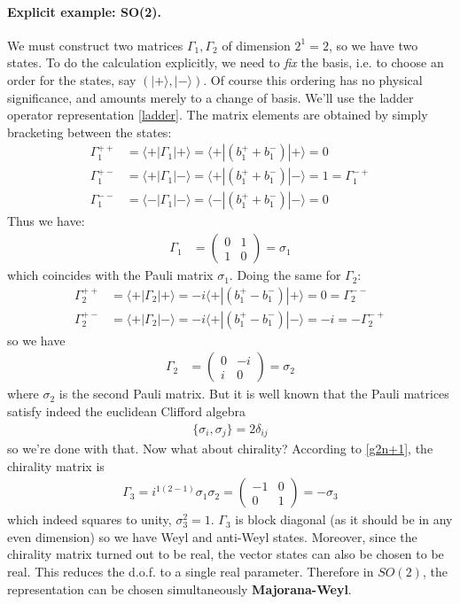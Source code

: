 \documentclass[a4paper,12pt]{article}
\numberwithin{equation}{section}
\numberwithin{exe}{section}
\newcommand{\G}{{\Gamma}}
\newcommand{\ket}[1]{| #1 \rangle}
\newcommand{\bra}[1]{\langle #1 |}
\begin{document}
\paragraph{Explicit example: SO(2).} We must construct two matrices $\G_1,\G_2$ of dimension $2^1=2$, so we have two states. To do the calculation explicitly, we need to \textit{fix} the basis, i.e. to choose an order for the states, say $\left( \ket{+},\ket{-} \right)$. Of course this ordering has no physical significance, and amounts merely to a change of basis. We'll use the ladder operator representation \eqref{ladder}. The matrix elements are obtained by simply bracketing between the states:
	\begin{align}\label{}
	\G_1^{++}&=\bra{+}  \G_1 \ket{+}=\bra{+}  \left( b_1^++b_1^- \right) \ket{+}=0\\
	\G_1^{+-}&=\bra{+}  \G_1 \ket{-}=\bra{+}  \left( b_1^++b_1^- \right) \ket{-}=1 = \G_1^{-+} \\
	\G_1^{--}&=\bra{-}  \G_1 \ket{-}=\bra{-} \left( b_1^++b_1^- \right) \ket{-}=0
	\end{align}
Thus we have:
	\begin{align}\label{}
	\G_1&=\left( \begin{array}{cc}  0 & 1 \\ 1 & 0 \end{array} \right) = \sigma_1
	\end{align}
which coincides with the Pauli matrix $\sigma_1$. Doing the same for $\G_2$:
	\begin{align}\label{}
	\G_2^{++} & = \bra + \G_2 \ket + = -i\bra + \left( b_1^+ - b_1^- \right) \ket + =0 = \G_2^{--}\\
	\G_2^{+-} & = \bra + \G _2 \ket - = -i \bra + \left( b_1^+-b_1^- \right) \ket - = -i = - \G_2^{-+}
	\end{align}
so we have
	\begin{align}\label{}
	\G_2&=\left( \begin{array}{cc}  0 & -i \\ i & 0 \end{array} \right) = \sigma_2
	\end{align}
where $\sigma_2$ is the second Pauli matrix. But it is well known that the Pauli matrices satisfy indeed the euclidean Clifford algebra
	\begin{align}\label{}
	\{ \sigma_i,\sigma_j \}=2\delta_{ij}
	\end{align}
so we're done with that. Now what about chirality? According to \eqref{g2n+1}, the chirality matrix is
	\begin{align}\label{}
	\G_3=i^{1(2-1)}\sigma_1\sigma_2 = \left( \begin{array}{cc}  -1 & 0 \\ 0 & 1 \end{array} \right)  = - \sigma_3
	\end{align}
which indeed squares to unity, $\sigma_3^2=1$. $\G_3$ is block diagonal (as it should be in any even dimension) so we have Weyl and anti-Weyl states. Moreover, since the chirality matrix turned out to be real, the vector states can also be chosen to be real. This reduces the d.o.f. to a single real parameter. Therefore in $SO(2)$, the representation can be chosen simultaneously \textbf{Majorana-Weyl}. 
\end{document}
